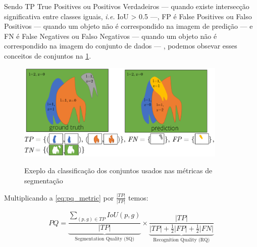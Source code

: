 Sendo TP True Positives ou Positivos Verdadeiros — quando existe intersecção significativa entre classes iguais, \emph{i.e.} IoU > 0.5 —,  FP é False Positives ou Falso Positivos — quando um objeto não é correspondido na imagem de predição — e FN é False Negatives ou Falso Negativos — quando um objeto não é correspondido na imagem do conjunto de dados — , podemos obsevar esses conceitos de conjuntos na \cref{fig:conjuntos}.
\begin{figure}[H]
	\caption{Exeplo da classificação dos conjuntos usados nas métricas de segmentação}
	\centering %
	\includegraphics[width=10cm]{figures/pan_metric.png} %
	\label{fig:conjuntos}
\end{figure}

Multiplicando a \cref{eq:pq_metric} por $\frac{|TP|}{|TP|}$ temos:

\begin{equation*}
	PQ = \underbrace{\frac{\sum_{(p,g)\in TP}IoU(p,g)}{|TP|}}_{\text{Segmentation Quality (SQ)}} 
	\times
	\underbrace{\frac{|TP|}{|TP| + \frac{1}{2}|FP| + \frac{1}{2}|FN|}}_{\text{Recognition Quality (RQ)}}
\end{equation*}


